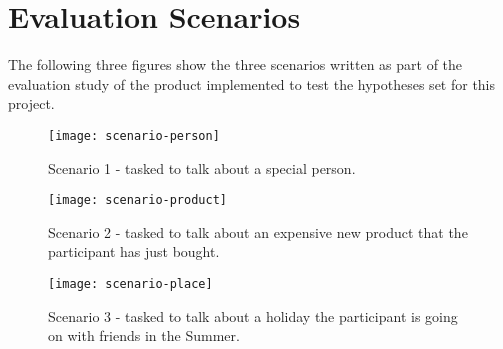 \chapter{Evaluation Scenarios}\label{app:scenarios}
The following three figures show the three scenarios written as part of the evaluation study of the product implemented to test the hypotheses set for this project.\\

\begin{figure}[h]
	\centering
	\texttt{[image: scenario-person]}
	\caption{Scenario 1 - tasked to talk about a special person.}
\end{figure}
\begin{figure}[h]
	\centering
	\texttt{[image: scenario-product]}
	\caption{Scenario 2 - tasked to talk about an expensive new product that the participant has just bought.}
\end{figure}

\begin{figure}[h]
	\centering
	\texttt{[image: scenario-place]}
	\caption{Scenario 3 - tasked to talk about a holiday the participant is going on with friends in the Summer.}
\end{figure}